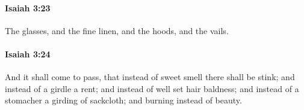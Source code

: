 		\paragraph{Isaiah 3:23} %
			\label{ISAIAH-3-23}

			The glasses, and the fine linen, and the hoods, and the vails.


		\paragraph{Isaiah 3:24} %
			\label{ISAIAH-3-24}

			And it shall come to pass, that instead of sweet smell there shall be stink; and instead of a girdle a rent; and instead of well set hair baldness; and instead of a stomacher a girding of sackcloth; and burning instead of beauty.


